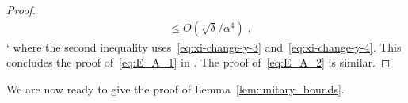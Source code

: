 \begin{proof}
\begin{align*}
& \leq  O(\sqrt{\delta}/\alpha^4)\;,
\end{align*}`
where the second inequality uses~\eqref{eq:xi-change-y-3} and~\eqref{eq:xi-change-y-4}. This concludes the proof of~\eqref{eq:E_A_1} in . The proof of~\eqref{eq:E_A_2} is similar.
%
\end{proof}

We are now ready to give the proof of Lemma~\ref{lem:unitary_bounds}.

